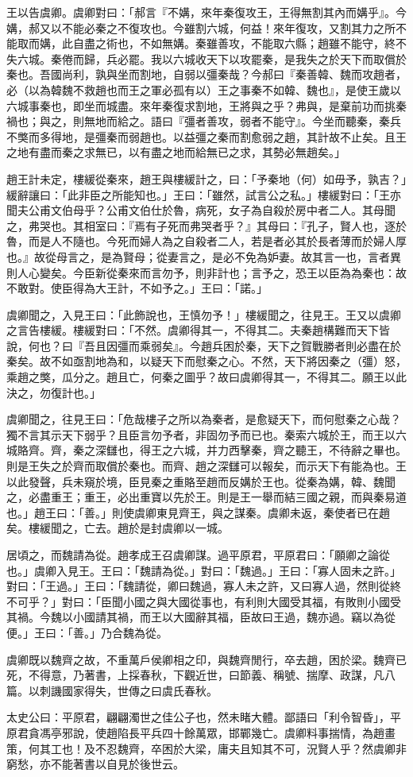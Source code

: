 \begin{pinyinscope}
王以告虞卿。虞卿對曰：「郝言『不媾，來年秦復攻王，王得無割其內而媾乎』。今媾，郝又以不能必秦之不復攻也。今雖割六城，何益！來年復攻，又割其力之所不能取而媾，此自盡之術也，不如無媾。秦雖善攻，不能取六縣；趙雖不能守，終不失六城。秦倦而歸，兵必罷。我以六城收天下以攻罷秦，是我失之於天下而取償於秦也。吾國尚利，孰與坐而割地，自弱以彊秦哉？今郝曰『秦善韓、魏而攻趙者，必（以為韓魏不救趙也而王之軍必孤有以）王之事秦不如韓、魏也』，是使王歲以六城事秦也，即坐而城盡。來年秦復求割地，王將與之乎？弗與，是棄前功而挑秦禍也；與之，則無地而給之。語曰『彊者善攻，弱者不能守』。今坐而聽秦，秦兵不獘而多得地，是彊秦而弱趙也。以益彊之秦而割愈弱之趙，其計故不止矣。且王之地有盡而秦之求無已，以有盡之地而給無已之求，其勢必無趙矣。」

趙王計未定，樓緩從秦來，趙王與樓緩計之，曰：「予秦地（何）如毋予，孰吉？」緩辭讓曰：「此非臣之所能知也。」王曰：「雖然，試言公之私。」樓緩對曰：「王亦聞夫公甫文伯母乎？公甫文伯仕於魯，病死，女子為自殺於房中者二人。其母聞之，弗哭也。其相室曰：『焉有子死而弗哭者乎？』其母曰：『孔子，賢人也，逐於魯，而是人不隨也。今死而婦人為之自殺者二人，若是者必其於長者薄而於婦人厚也。』故從母言之，是為賢母；從妻言之，是必不免為妒妻。故其言一也，言者異則人心變矣。今臣新從秦來而言勿予，則非計也；言予之，恐王以臣為為秦也：故不敢對。使臣得為大王計，不如予之。」王曰：「諾。」

虞卿聞之，入見王曰：「此飾說也，王慎勿予！」樓緩聞之，往見王。王又以虞卿之言告樓緩。樓緩對曰：「不然。虞卿得其一，不得其二。夫秦趙構難而天下皆說，何也？曰『吾且因彊而乘弱矣』。今趙兵困於秦，天下之賀戰勝者則必盡在於秦矣。故不如亟割地為和，以疑天下而慰秦之心。不然，天下將因秦之（彊）怒，乘趙之獘，瓜分之。趙且亡，何秦之圖乎？故曰虞卿得其一，不得其二。願王以此決之，勿復計也。」

虞卿聞之，往見王曰：「危哉樓子之所以為秦者，是愈疑天下，而何慰秦之心哉？獨不言其示天下弱乎？且臣言勿予者，非固勿予而已也。秦索六城於王，而王以六城賂齊。齊，秦之深讎也，得王之六城，并力西擊秦，齊之聽王，不待辭之畢也。則是王失之於齊而取償於秦也。而齊、趙之深讎可以報矣，而示天下有能為也。王以此發聲，兵未窺於境，臣見秦之重賂至趙而反媾於王也。從秦為媾，韓、魏聞之，必盡重王；重王，必出重寶以先於王。則是王一舉而結三國之親，而與秦易道也。」趙王曰：「善。」則使虞卿東見齊王，與之謀秦。虞卿未返，秦使者已在趙矣。樓緩聞之，亡去。趙於是封虞卿以一城。

居頃之，而魏請為從。趙孝成王召虞卿謀。過平原君，平原君曰：「願卿之論從也。」虞卿入見王。王曰：「魏請為從。」對曰：「魏過。」王曰：「寡人固未之許。」對曰：「王過。」王曰：「魏請從，卿曰魏過，寡人未之許，又曰寡人過，然則從終不可乎？」對曰：「臣聞小國之與大國從事也，有利則大國受其福，有敗則小國受其禍。今魏以小國請其禍，而王以大國辭其福，臣故曰王過，魏亦過。竊以為從便。」王曰：「善。」乃合魏為從。

虞卿既以魏齊之故，不重萬戶侯卿相之印，與魏齊閒行，卒去趙，困於梁。魏齊已死，不得意，乃著書，上採春秋，下觀近世，曰節義、稱號、揣摩、政謀，凡八篇。以刺譏國家得失，世傳之曰虞氏春秋。

太史公曰：平原君，翩翩濁世之佳公子也，然未睹大體。鄙語曰「利令智昏」，平原君貪馮亭邪說，使趙陷長平兵四十餘萬眾，邯鄲幾亡。虞卿料事揣情，為趙畫策，何其工也！及不忍魏齊，卒困於大梁，庸夫且知其不可，況賢人乎？然虞卿非窮愁，亦不能著書以自見於後世云。


\end{pinyinscope}